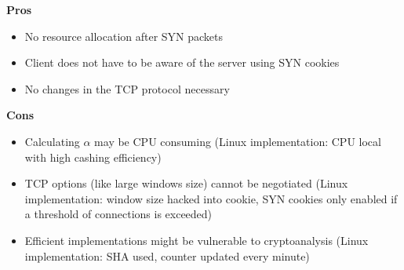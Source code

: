 \begin{minipage}[t]{0.49\textwidth}
  \textbf{Pros}
  \begin{itemize}[topsep=0pt,noitemsep]
    \item No resource allocation after SYN packets
    \item Client does not have to be aware of the server using SYN cookies
    \item No changes in the TCP protocol necessary
  \end{itemize}
\end{minipage}
\begin{minipage}[t]{0.49\textwidth}
  \textbf{Cons}
  \begin{itemize}[topsep=0pt, noitemsep]
    \item Calculating $\alpha$ may be CPU consuming (Linux implementation: CPU local with high cashing efficiency)
    \item TCP options (like large windows size) cannot be negotiated (Linux implementation: window size hacked into cookie, SYN cookies only enabled if a threshold of connections is exceeded)
    \item Efficient implementations might be vulnerable to cryptoanalysis (Linux implementation: SHA used, counter updated every minute)
  \end{itemize}
\end{minipage}
\vspace{20pt}

